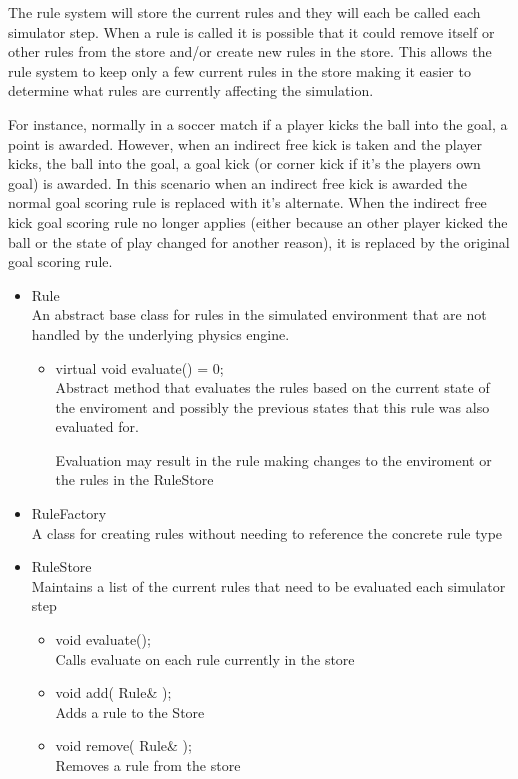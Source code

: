 \documentclass[a4paper,12pt]{article}
\begin{document}
The rule system will store the current rules and they will each be called each
simulator step.  When a rule is called it is possible that it could remove itself
or other rules from the store and/or create new rules in the store.  This allows
the rule system to keep only a few current rules in the store making it easier to
determine what rules are currently affecting the simulation.

For instance, normally in a soccer match if a player kicks the ball into the goal,
a point is awarded.  However, when an indirect free kick is taken and the player kicks,
the ball into the goal, a goal kick (or corner kick if it's the players own goal) is
awarded.  In this scenario when an indirect free kick is awarded the normal goal scoring
rule is replaced with it's alternate.  When the indirect free kick goal scoring rule
no longer applies (either because an other player kicked the ball or the state of play
changed for another reason), it is replaced by the original goal scoring rule.

\begin{itemize}
\item Rule\\
  An abstract base class for rules in the simulated environment that are not
  handled by the underlying physics engine.
  \begin{itemize}
  \item virtual void evaluate() = 0;\\
    Abstract method that evaluates the rules based on the current state of
    the enviroment and possibly the previous states that this rule was also
    evaluated for.

    Evaluation may result in the rule making changes to the enviroment or the
    rules in the RuleStore
  \end{itemize}

\item RuleFactory\\
  A class for creating rules without needing to reference the concrete rule type

\item RuleStore\\
  Maintains a list of the current rules that need to be evaluated each simulator
  step
  \begin{itemize}
  \item void evaluate();\\
    Calls evaluate on each rule currently in the store
  \item void add( Rule\& );\\
    Adds a rule to the Store
  \item void remove( Rule\& );\\
    Removes a rule from the store
  \end{itemize}
\end{itemize}





\end{document}
